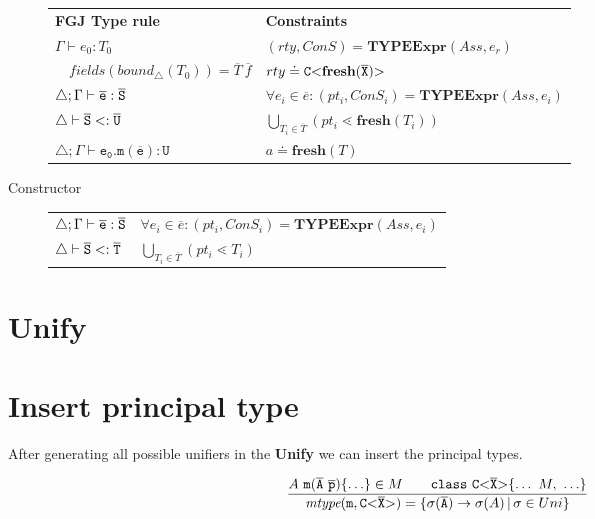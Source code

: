 \documentclass[runningheads]{llncs}
\begin{document}
\begin{description}
 \begin{tabular}{l|l}
   \textbf{FGJ Type rule} & \textbf{Constraints} \\
   $\Gamma \vdash e_0:T_0$ & $(rty, ConS) = \textbf{TYPEExpr}(Ass, e_r)$\\ 
   $\quad \mathit{fields}(\mathit{bound}_\triangle(T_0)) = \overline{T} \ \overline{f}$ & $rty \doteq \mathtt{C {\tt <} \textbf{fresh}(\overline{\tt X}) {\tt >} }$ \\
  $\triangle; \Gamma \vdash \overline{\tt e} : \overline{\tt S}$ & $\forall e_i \in \overline{e} : (pt_i, ConS_i) = \textbf{TYPEExpr}(Ass, e_i)$\\
  $\triangle \vdash \overline{\tt S} <: \overline{\tt U}$ & $ \bigcup_{T_i \in \overline{T}} (pt_i \lessdot \textbf{fresh}(T_i))$\\
  $\triangle; \Gamma \vdash \mathtt{e_0.m(\overline{e}) : U }$ & $a \doteq \textbf{fresh}(T)$ \\
 \end{tabular}
 \item[Constructor]

\begin{tabular}{l|l}
  $\triangle; \Gamma \vdash \overline{\tt e} : \overline{\tt S}$ & $\forall e_i \in \overline{e} : (pt_i, ConS_i) = \textbf{TYPEExpr}(Ass, e_i)$\\
  $\triangle \vdash \overline{\tt S} <: \overline{\tt T}$ & $\bigcup_{T_i \in \overline{T}} (pt_i \lessdot T_i)$
\end{tabular}
  
\end{description}

\section{Unify}




\section{Insert principal type}
After generating all possible unifiers in the \textbf{Unify} we can insert the principal types.

\begin{align*}
\frac{\displaystyle 
  A\ \texttt{m}(\overline{\tt A}\ \overline{\tt p}) \{ \ldots \} \in M \quad \quad \texttt{class}\ \mathtt{C {\tt <} \overline{\tt X} {\tt >} } \{ \ldots\ M,\ \ldots\}
}{\displaystyle 
  \textit{mtype}(\texttt{m}, \mathtt{C {\tt <} \overline{\tt X} {\tt >} }) = \{ \sigma(\overline{\tt A}) \to \sigma(A) \,|\, \sigma \in {Uni} \}
}
\end{align*}
\end{document}

